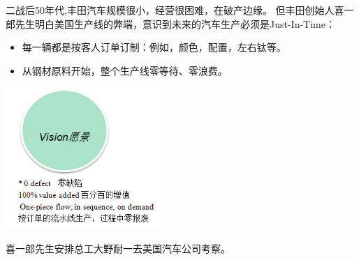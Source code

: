 


二战后50年代,丰田汽车规模很小，经营很困难，在破产边缘。
但丰田创始人喜一郎先生明白美国生产线的弊端，意识到未来的汽车生产必须是Just-In-Time：

\begin{itemize}
\tightlist
\item
  每一辆都是按客人订单订制：例如，颜色，配置，左右钛等。
\item
  从钢材原料开始，整个生产线零等待、零浪费。
\end{itemize}

\begin{description}
\item[]
\end{description}


\includegraphics[width=6cm]{远景1.png}

喜一郎先生安排总工大野耐一去美国汽车公司考察。

